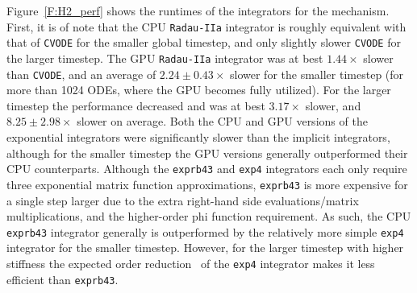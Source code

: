\documentclass[preprint]{elsarticle}
\begin{document}
Figure~\ref{F:H2_perf} shows the runtimes of the integrators for the  mechanism.
First, it is of note that the CPU \texttt{Radau-IIa} integrator is roughly equivalent with that of \texttt{CVODE} for the smaller global timestep, and only slightly slower \texttt{CVODE} for the larger timestep.
The GPU \texttt{Radau-IIa} integrator was at best $1.44\times$ slower than \texttt{CVODE}, and an average of $2.24\pm0.43\times$ slower for the smaller timestep (for more than 1024 ODEs, where the GPU becomes fully utilized).
For the larger timestep the performance decreased and was at best $3.17\times$ slower, and $8.25\pm2.98\times$ slower on average.
Both the CPU and GPU versions of the exponential integrators were significantly slower than the implicit integrators, although for the smaller timestep the GPU versions generally outperformed their CPU counterparts.
Although the \texttt{exprb43} and \texttt{exp4} integrators each only require three exponential matrix function approximations, \texttt{exprb43} is more expensive for a single step larger due to the extra right-hand side evaluations\slash matrix multiplications, and the higher-order phi function requirement.
As such, the CPU \texttt{exprb43} integrator generally is outperformed by the relatively more simple \texttt{exp4} integrator for the smaller timestep.
However, for the larger timestep with higher stiffness the expected order reduction~\cite{Bisetti:2012jw} of the \texttt{exp4} integrator makes it less efficient than \texttt{exprb43}.
\end{document}
